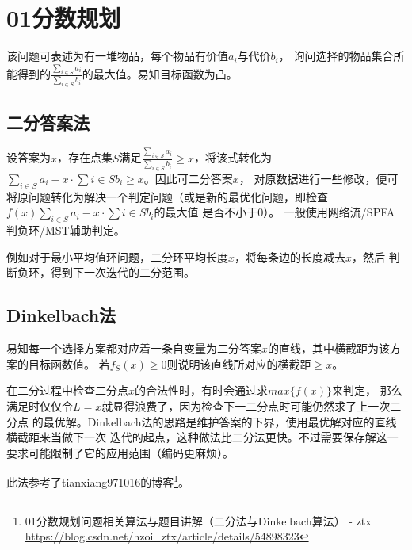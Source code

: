 \section{01分数规划}
该问题可表述为有一堆物品，每个物品有价值$a_i$与代价$b_i$，
询问选择的物品集合所能得到的$\displaystyle \frac{\sum_{i\in S}{a_i}}
	{\sum_{i\in S}{b_i}}$的最大值。易知目标函数为凸。

\subsection{二分答案法}

设答案为$x$，存在点集$S$满足$\displaystyle \frac{\sum_{i\in S}{a_i}}
	{\sum_{i\in S}{b_i}}\geq x$，将该式转化为$\displaystyle
	\sum_{i\in S}{a_i}-x\cdot \sum{i\in S}{b_i}\geq x$。因此可二分答案$x$，
对原数据进行一些修改，便可将原问题转化为解决一个判定问题（或是新的最优化问题，即检查
$\displaystyle f(x)\sum_{i\in S}{a_i}-x\cdot \sum{i\in S}{b_i}$的最大值
是否不小于0）。
一般使用网络流/SPFA判负环/MST辅助判定。

例如对于最小平均值环问题，二分环平均长度$x$，将每条边的长度减去$x$，然后
判断负环，得到下一次迭代的二分范围。

\subsection{Dinkelbach法}
易知每一个选择方案都对应着一条自变量为二分答案$x$的直线，其中横截距为该方案的目标函数值。
若$f_S(x)\geq 0$则说明该直线所对应的横截距$\geq x$。

在二分过程中检查二分点$x$的合法性时，有时会通过求$max\{f(x)\}$来判定，
那么满足时仅仅令$L=x$就显得浪费了，因为检查下一二分点时可能仍然求了上一次二分点
的最优解。Dinkelbach法的思路是维护答案的下界，使用最优解对应的直线横截距来当做下一次
迭代的起点，这种做法比二分法更快。不过需要保存解这一要求可能限制了它的应用范围（编码更麻烦）。

此法参考了tianxiang971016的博客\footnote{
	01分数规划问题相关算法与题目讲解（二分法与Dinkelbach算法） - ztx
	\url{https://blog.csdn.net/hzoi\_ztx/article/details/54898323}
}。
